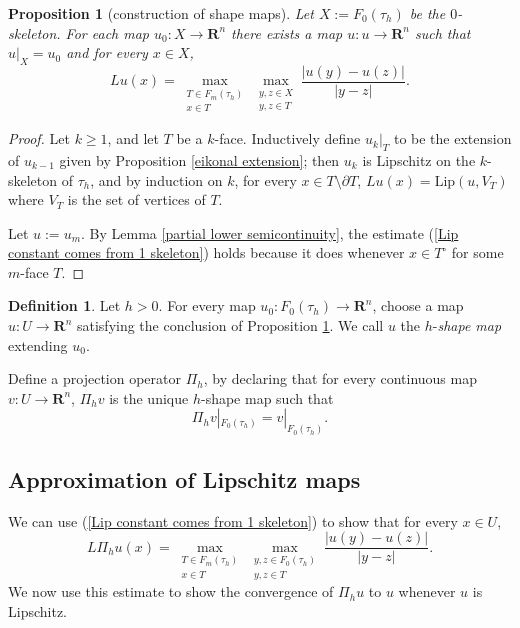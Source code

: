 \documentclass[reqno,11pt]{amsart}
\newcommand{\RR}{\mathbf{R}}
\newcommand{\Lip}{\mathrm{Lip}}
\newcommand{\dfn}[1]{\emph{#1}\index{#1}}
\newtheorem{proposition}[theorem]{Proposition}
\theoremstyle{definition}
\newtheorem{definition}[theorem]{Definition}
\numberwithin{equation}{section}
\begin{document}
\begin{proposition}[construction of shape maps]\label{construction of shape maps}
Let $X := F_0(\tau_h)$ be the $0$-skeleton.
For each map $u_0: X \to \RR^n$ there exists a map $u: u \to \RR^n$ such that $u|_X = u_0$ and for every $x \in X$,
\begin{equation}\label{Lip constant comes from 1 skeleton}
Lu(x) = \max_{\substack{T \in F_m(\tau_h) \\ x \in T}} \max_{\substack{y, z \in X \\ y, z \in T}} \frac{|u(y) - u(z)|}{|y - z|}.
\end{equation}
\end{proposition}
\begin{proof}
Let $k \geq 1$, and let $T$ be a $k$-face.
Inductively define $u_k|_T$ to be the extension of $u_{k - 1}$ given by Proposition \ref{eikonal extension}; then $u_k$ is Lipschitz on the $k$-skeleton of $\tau_h$, and by induction on $k$, for every $x \in T \setminus \partial T$, $Lu(x) = \Lip(u, V_T)$ where $V_T$ is the set of vertices of $T$.

Let $u := u_m$.
By Lemma \ref{partial lower semicontinuity}, the estimate (\ref{Lip constant comes from 1 skeleton}) holds because it does whenever $x \in T^\circ$ for some $m$-face $T$.
\end{proof}

\begin{definition}\label{shape map}
Let $h > 0$.
For every map $u_0: F_0(\tau_h) \to \RR^n$, choose a map $u: U \to \RR^n$ satisfying the conclusion of Proposition \ref{construction of shape maps}.
We call $u$ the $h$-\dfn{shape map} extending $u_0$.

Define a projection operator $\Pi_h$, by declaring that for every continuous map $v: U \to \RR^n$, $\Pi_h v$ is the unique $h$-shape map such that 
$$\Pi_h v|_{F_0(\tau_h)} = v|_{F_0(\tau_h)}.$$
\end{definition}

\subsection{Approximation of Lipschitz maps}
We can use (\ref{Lip constant comes from 1 skeleton}) to show that for every $x \in U$,
\begin{equation}\label{discrete derivative is vertex lip}
L \Pi_h u(x) = \max_{\substack{T \in F_m(\tau_h) \\ x \in T}} \max_{\substack{y, z \in F_0(\tau_h) \\ y, z \in T}} \frac{|u(y) - u(z)|}{|y - z|}.
\end{equation}
We now use this estimate to show the convergence of $\Pi_h u$ to $u$ whenever $u$ is Lipschitz.
\end{document}
